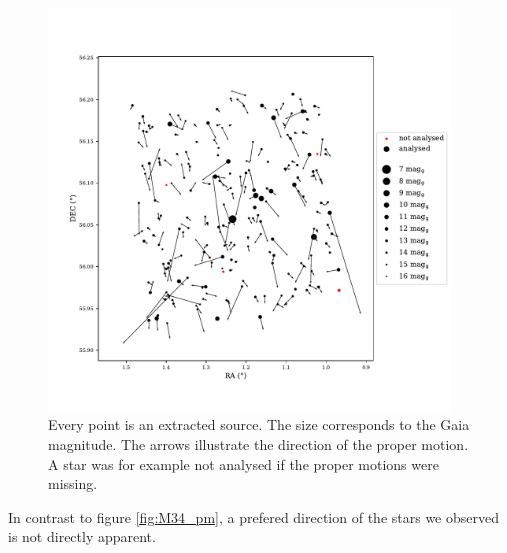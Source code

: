 \documentclass{article}
\begin{document}
\begin{figure}[H]
  \centering
    \includegraphics[trim={0 1.6cm 0 2.3cm},clip, width=0.95\textwidth]{Stock19_pm.pdf}
  \caption{Every point is an extracted source. The size corresponds to the Gaia magnitude. The arrows illustrate the direction of the proper motion. A star was for example not analysed if the proper motions were missing.}
  \label{fig:Stock19_pm}
\end{figure}

In contrast to figure \ref{fig:M34_pm}, a prefered direction of the stars we observed is not directly apparent. 
\end{document}
